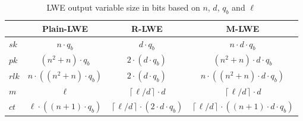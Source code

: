 \begin{table}[h]
  \centering
  \caption{LWE output variable size in bits based on $n$, $d$, $q_b$ and $\ell$}
  \begin{tabular}{|l|c|c|c|}
    \toprule
          & Plain-LWE                       & R-LWE                                                        & M-LWE                                                               \\
    \midrule
    $sk$  & $n \cdot q_b$                   & $d \cdot q_b$                                                & $n \cdot d \cdot q_b$                                               \\
    $pk$  & $(n^2 +n) \cdot q_b$            & $2 \cdot (d \cdot q_b)$                                      & $(n^2 + n)\cdot d \cdot q_b$                                        \\
    $rlk$ & $n \cdot ((n^2 +n) \cdot q_b)$  & $2 \cdot (d \cdot q_b)$                                      & $n \cdot ((n^2 + n)\cdot d \cdot q_b)$                              \\
    $m$   & $\ell$                          & $\left\lceil \ell/d \right\rceil \cdot d$                    & $\left\lceil \ell/d \right\rceil \cdot d$                           \\
    $ct$  & $\ell \cdot((n + 1) \cdot q_b)$ & $\left\lceil \ell/d \right\rceil \cdot(2 \cdot d \cdot q_b)$ & $\left\lceil \ell/d \right\rceil \cdot ((n + 1) \cdot d \cdot q_b)$ \\
    \bottomrule
    
  \end{tabular}
  \label{table:OutputVariableSize}
\end{table}

